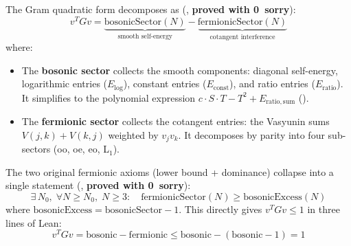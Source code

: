 \begin{principle}
The Gram quadratic form decomposes as (,
\textbf{proved with 0~sorry}):
\begin{equation}
  v^T G v = \underbrace{\text{bosonicSector}(N)}_{\text{smooth self-energy}}
  - \underbrace{\text{fermionicSector}(N)}_{\text{cotangent interference}}
  \label{eq:susy-decomp}
\end{equation}
where:
\begin{itemize}
  \item The \textbf{bosonic sector} collects the smooth components:
    diagonal self-energy, logarithmic entries ($E_{\mathrm{log}}$),
    constant entries ($E_{\mathrm{const}}$), and ratio entries
    ($E_{\mathrm{ratio}}$). It simplifies to the polynomial expression
    $c \cdot S \cdot T - T^2 + E_{\mathrm{ratio,sum}}$
    ().
  \item The \textbf{fermionic sector} collects the cotangent entries:
    the Vasyunin sums $V(j,k) + V(k,j)$ weighted by $v_j v_k$.
    It decomposes by parity into four sub-sectors (oo, oe, eo, L$_1$).
\end{itemize}
\end{principle}

\begin{principle}
The two original fermionic axioms (lower bound + dominance) collapse
into a single statement (,
\textbf{proved with 0~sorry}):
\begin{equation}
  \exists\, N_0,\; \forall N \geq N_0,\; N \geq 3:\quad
  \text{fermionicSector}(N) \geq \text{bosonicExcess}(N)
  \label{eq:unified-fermionic}
\end{equation}
where $\text{bosonicExcess} = \text{bosonicSector} - 1$.
This directly gives $v^T G v \leq 1$ in three lines of Lean:
\[
  v^T G v = \text{bosonic} - \text{fermionic}
  \leq \text{bosonic} - (\text{bosonic} - 1) = 1
\]
\end{principle}

